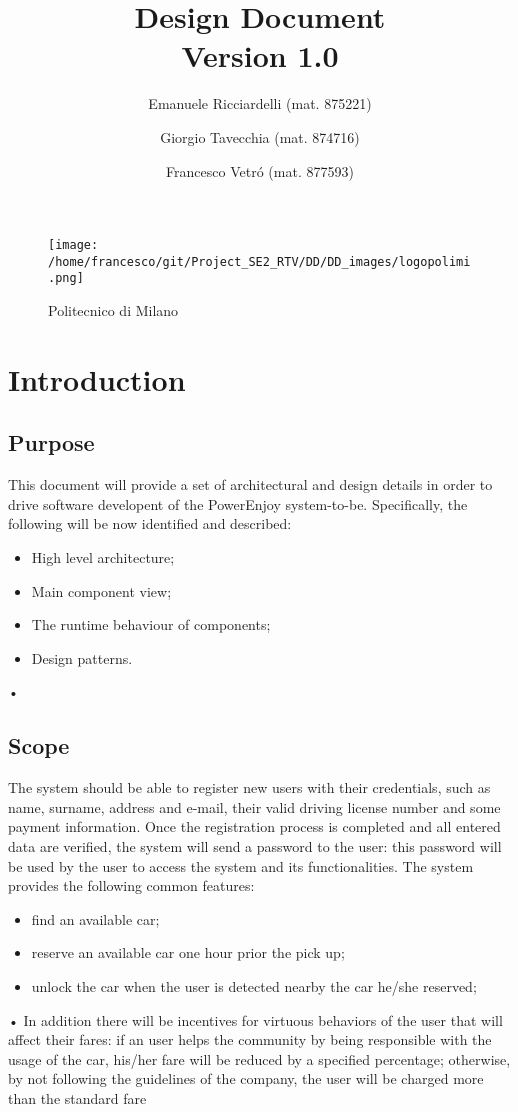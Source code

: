 \documentclass[10pt, a4paper,titlepage]{article}
\begin{document}
\begin{titlepage}
\title{Design Document \\Version 1.0}
\author{Emanuele Ricciardelli (mat. 875221) \and Giorgio Tavecchia (mat. 874716) \and Francesco Vetr\'o (mat. 877593)}
\begin{figure}
\begin{center}
\texttt{[image: /home/francesco/git/Project\_SE2\_RTV/DD/DD\_images/logopolimi.png]}
\caption{Politecnico di Milano}
\label{fig:logo}
\end{center}
\end{figure}
\maketitle
\end{titlepage}
\tableofcontents
\pagebreak
\section{Introduction}
\subsection{Purpose}
This document will provide a set of architectural and design details in order to drive software developent of the PowerEnjoy system-to-be. Specifically,  the following will be now identified and described:
\begin{itemize}
\item High level architecture;
\item Main component view;
\item The runtime behaviour of components;
\item Design patterns.
\end{itemize}•
\subsection{Scope}
The system should be able to register new users with their credentials, such as name, surname, address and e-mail, their valid driving license number and some payment information. Once the registration process is completed and all entered data are veriﬁed, the system will send a password to the user: this password will be used by the user to access the system and its functionalities. The system provides the following common features: 
\begin{itemize}
\item find an available car;
\item reserve an available car one hour prior the pick up; 
\item unlock the car when the user is detected nearby the car he/she reserved;
\end{itemize}•
In addition there will be incentives for virtuous behaviors of the user that will aﬀect their fares: if an user helps the community by being responsible with the usage of the car, his/her fare will be reduced by a speciﬁed percentage; otherwise, by not following the guidelines of the company, the user will be charged more than the standard fare
\end{document}
